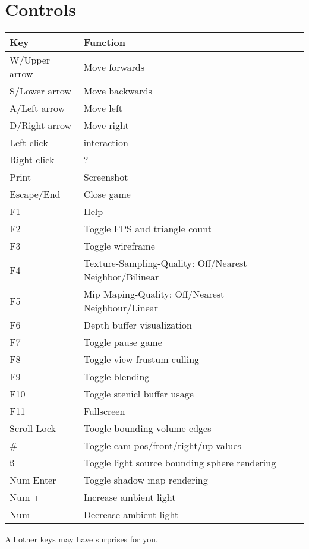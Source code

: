 \documentclass[12pt]{article}
\begin{document}
\section{Controls \label{Controls}}

\begin{table}[h!]
  \centering
  \label{Controls}
  \begin{tabular}{l|l}
    \textbf{Key} & \textbf{Function}\\ \hline
        W/Upper arrow & Move forwards\\ \hline
       	S/Lower arrow & Move backwards\\ \hline
       	A/Left arrow & Move left\\ \hline
       	D/Right arrow & Move right\\ \hline
       	Left click & interaction\\ \hline
       	Right click & ?\\ \hline
       	Print & Screenshot\\ \hline
       	Escape/End & Close game\\ \hline
       	 F1& Help\\ \hline
       	 F2& Toggle FPS and triangle count\\ \hline
       	 F3& Toggle wireframe\\ \hline
       	 F4& Texture-Sampling-Quality: Off/Nearest Neighbor/Bilinear\\ \hline
       	 F5& Mip Maping-Quality: Off/Nearest Neighbour/Linear\\ \hline
       	 F6& Depth buffer visualization\\ \hline
       	 F7& Toggle pause game\\ \hline
       	 F8& Toggle view frustum culling\\ \hline
       	 F9& Toggle blending\\ \hline
       	F10& Toggle stenicl buffer usage\\ \hline
       	F11& Fullscreen\\ \hline
       	Scroll Lock& Toogle bounding volume edges\\ \hline
       	\# & Toggle cam pos/front/right/up values\\ \hline
       	\ss & Toggle light source bounding sphere rendering\\ \hline
       	Num Enter & Toggle shadow map rendering\\ \hline
       	Num + & Increase ambient light\\ \hline
       	Num - & Decrease ambient light\\
  \end{tabular}
\end{table}
All other keys may have surprises for you.
\end{document}
